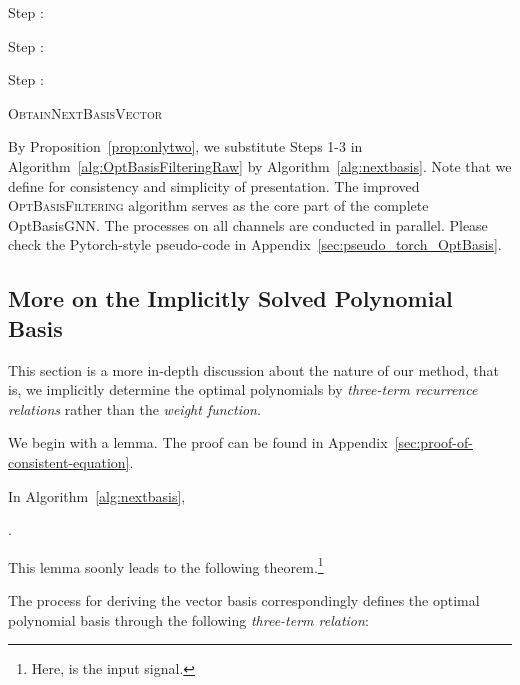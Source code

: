 \begin{algorithm}[t]
    \SetNoFillComment
    \SetAlgoNoLine
    \DontPrintSemicolon
\KwOut{} 
    \BlankLine
    \Indp
Step :  


    Step :  


    Step :  


    \KwRet{}
    \caption{
        \textsc{ObtainNextBasisVector} 
}
    \label{alg:nextbasis}
\end{algorithm} 
By Proposition~\ref{prop:onlytwo}, 
we substitute Steps 1-3 in Algorithm~\ref{alg:OptBasisFilteringRaw}
by Algorithm~\ref{alg:nextbasis}.
Note that 
we define 
for consistency and simplicity of presentation.
The improved \textsc{OptBasisFiltering} algorithm 
serves as the core part of the complete OptBasisGNN.
The processes on all channels are conducted in parallel.
Please check the Pytorch-style pseudo-code in Appendix~\ref{sec:pseudo_torch_OptBasis}.


\subsection{More on the Implicitly Solved Polynomial Basis}

This section is a more in-depth discussion about the nature of our method, that is, we implicitly determine the optimal polynomials by \textit{three-term recurrence relations} rather than the \textit{weight function}.  

We begin with a lemma. The proof can be found in Appendix~\ref{sec:proof-of-consistent-equation}.

\begin{lemma}
  In Algorithm~\ref{alg:nextbasis}, 
  
  \label{lemma:consistent}.
\end{lemma}


This lemma soonly leads to the following theorem.\footnote{Here,   is the input signal.}

\begin{tcolorbox}[boxrule=0.pt,height=52mm,valign=top,colback=blue!3!white]
\begin{theorem}
The process for deriving the vector basis  
correspondingly defines the optimal polynomial basis 
through the following \textit{three-term relation}: 

\label{thm:3term-implicit}
\end{theorem}
\end{tcolorbox}


